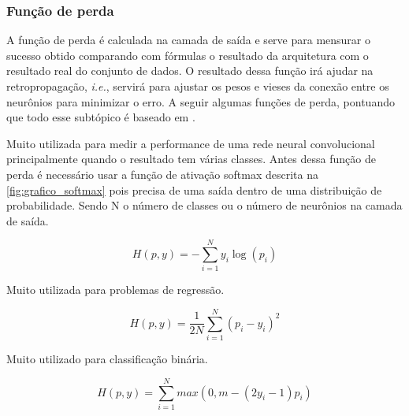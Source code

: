 \subsubsection*{Função de perda}

A função de perda é calculada na camada de saída e serve para mensurar o sucesso obtido comparando com fórmulas o resultado da arquitetura com o resultado real do conjunto de dados. O resultado dessa função irá ajudar na retropropagação, \emph{i.e.}, servirá para ajustar os pesos e vieses da conexão entre os neurônios para minimizar o erro. A seguir algumas funções de perda, pontuando que todo esse subtópico é baseado em 
.


Muito utilizada para medir a performance de uma rede neural convolucional principalmente quando o resultado tem várias classes. Antes dessa função de perda é necessário usar a função de ativação softmax descrita na \cref{fig:grafico_softmax} pois precisa de uma saída dentro de uma distribuição de probabilidade. Sendo N o número de classes ou o número de neurônios na camada de saída.

\begin{equation} 
    H(p,y) = -\sum_{i=1}^N y_i \log(p_i)
\end{equation}



Muito utilizada para problemas de regressão.

\begin{equation}
    H(p,y) = \frac{1}{2N} \sum_{i=1}^N (p_i - y_i)^2
\end{equation}


Muito utilizado para classificação binária.

\begin{equation}
    H(p,y) = \sum_{i=1}^N max(0, m - (2y_i - 1) p_i)
\end{equation}
